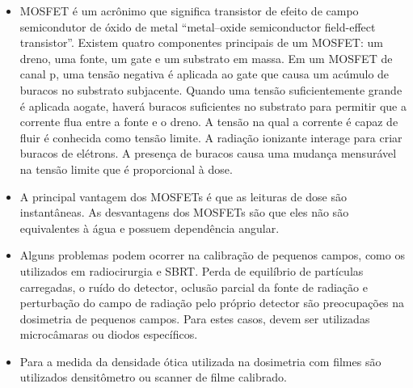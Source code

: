\documentclass[11pt,a4paper]{article}
\newcounter{exemplo}
\begin{document}
\begin{exemplo}
\begin{itemize}
        \item MOSFET é um acrônimo que significa transistor de efeito de campo semicondutor de óxido de metal ``metal–oxide semiconductor field-effect transistor''. Existem quatro componentes principais de um MOSFET: um dreno, uma fonte, um gate e um substrato em massa. Em um MOSFET de canal p, uma tensão negativa é aplicada ao gate que causa um acúmulo de buracos no substrato subjacente. Quando uma tensão suficientemente grande é aplicada aogate, haverá buracos suficientes no substrato para permitir que a corrente flua entre a fonte e o dreno. A tensão na qual a corrente é capaz de fluir é conhecida como tensão limite. A radiação ionizante interage para criar buracos de elétrons. A presença de buracos causa uma mudança mensurável na tensão limite que é proporcional à dose.
        
        \item A principal vantagem dos MOSFETs é que as leituras de dose são instantâneas. As desvantagens dos MOSFETs são que eles não são equivalentes à água e possuem dependência angular.
        
        \item Alguns problemas podem ocorrer na calibração de pequenos campos, como os utilizados em radiocirurgia e SBRT. Perda de equilíbrio de partículas carregadas, o ruído do detector, oclusão parcial da fonte de radiação e perturbação do campo de radiação pelo próprio detector são preocupações na dosimetria de pequenos campos. Para estes casos, devem ser utilizadas microcâmaras ou diodos específicos.
        
        \item Para a medida da densidade ótica utilizada na dosimetria com filmes são utilizados densitômetro ou scanner de filme calibrado.
        
    \end{itemize}
\end{exemplo}



\end{document}
